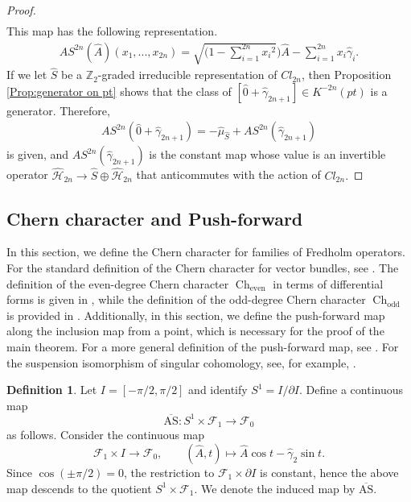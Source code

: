 \documentclass{amsart}
\theoremstyle{definition}
\newtheorem{dfn}[thm]{Definition}
\theoremstyle{remark}
\begin{document}
\begin{proof}
\begin{align*}
\end{align*}
This map has the following representation.
\begin{align*}
AS^{2n}(\hat{A})(x_1,...,x_{2n})=\sqrt{(1-\sum_{i=1}^{2n} {x_i}^2})\hat{A}-\sum_{i=1}^{2n} x_i \hat{\gamma}_i.
\end{align*}
If we let $\hat{S}$ be a $\mathbb{Z}_2$-graded irreducible representation of $Cl_{2n}$, then Proposition \ref{Prop:generator on pt} shows that the class of $[\hat{0} +  \hat{\gamma}_{2n+1}]\in K^{-2n}(pt)$ is a generator. Therefore,
\begin{align*}
AS^{2n}(\hat{0} +  \hat{\gamma}_{2n+1})=-\hat{\mu}_{\hat{S}} + AS^{2n}(\hat{\gamma}_{2n+1})
\end{align*}
is given, and $AS^{2n}(\hat{\gamma}_{2n+1})$ is the constant map whose value is an invertible operator $\hat{\mathcal{H}}_{2n}\to \hat{S}\oplus \hat{\mathcal{H}}_{2n}$ that anticommutes with the action of $Cl_{2n}.$
\end{proof}



\subsection{Chern character and Push-forward}\label{subsec:Chern character and Push-forward}


In this section, we define the Chern character for families of Fredholm operators. For the standard definition of the Chern character for vector bundles, see \cite{Husemoller}. The definition of the even-degree Chern character $\operatorname{Ch}_{\text{even}}$ in terms of differential forms is given in \cite{Tu}, while the definition of the odd-degree Chern character $\operatorname{Ch}_{\text{odd}}$ is provided in \cite{Quillen}. Additionally, in this section, we define the push-forward map along the inclusion map from a point, which is necessary for the proof of the main theorem. For a more general definition of the push-forward map, see \cite{Karoubi}. For the suspension isomorphism of singular cohomology, see, for example, \cite{Hatcher}.

\begin{dfn}\label{dfn:ASbar}
Let $I=[-\pi/2,\pi/2]$ and identify $S^{1}=I/\partial I$.
Define a continuous map
\[
\overline{\mathrm{AS}}: S^{1}\times \mathcal{F}_{1}\longrightarrow \mathcal{F}_{0}
\]
as follows. Consider the continuous map
\[
\mathcal{F}_{1}\times I \to \mathcal{F}_{0},\qquad (\hat{A},t)\mapsto \hat{A}\cos t-\hat\gamma_{2}\sin t .
\]
Since $\cos(\pm\pi/2)=0$, the restriction to $\mathcal{F}_{1}\times \partial I$ is constant,
hence the above map descends to the quotient $S^{1}\times \mathcal{F}_{1}$.
We denote the induced map by $\overline{\mathrm{AS}}$.
\end{dfn}
\end{document}

